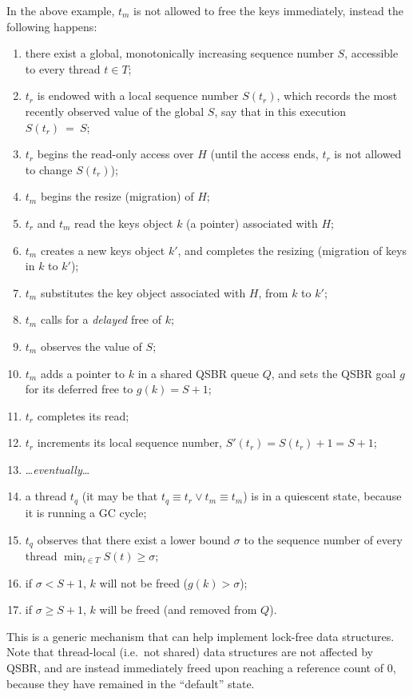 In the above example, $t_m$ is not allowed to free the keys immediately, instead the following happens:
\begin{enumerate}
    \item there exist a global, monotonically increasing sequence number $S$, accessible to every thread $t \in T$;
    \item $t_r$ is endowed with a local sequence number $S(t_r)$, which records the most recently observed value of the global $S$, say that in this execution $S(t_r)~=~S$;
    \item $t_r$ begins the read-only access over $H$ (until the access ends, $t_r$ is not allowed to change $S(t_r)$);
    \item $t_m$ begins the resize (migration) of $H$;
    \item $t_r$ and $t_m$ read the keys object $k$ (a pointer) associated with $H$;
    \item $t_m$ creates a new keys object $k'$, and completes the resizing (migration of keys in $k$ to $k'$);
    \item $t_m$ substitutes the key object associated with $H$, from $k$ to $k'$;
    \item $t_m$ calls for a \emph{delayed} free of $k$;
    \item $t_m$ observes the value of $S$;
    \item $t_m$ adds a pointer to $k$ in a shared QSBR queue $Q$, and sets the QSBR goal $g$ for its deferred free to $g(k) = S + 1$;
    \item $t_r$ completes its read;
    \item $t_r$ increments its local sequence number, $S'(t_r) = S(t_r) + 1 = S + 1$;
    \item \ldots\emph{eventually}\ldots
    \item a thread $t_q$ (it may be that $t_q \equiv t_r \vee t_m \equiv t_m$) is in a quiescent state, because it is running a GC cycle;
    \item $t_q$ observes that there exist a lower bound $\sigma$ to the sequence number of every thread $\min_{t \in T} S(t) \geq \sigma$;
    \item if $\sigma < S + 1$, $k$ will not be freed ($g(k) > \sigma$);
    \item if $\sigma \geq S + 1$, $k$ will be freed (and removed from $Q$).
\end{enumerate}

This is a generic mechanism that can help implement lock-free data structures.
Note that thread-local (i.e.\ not shared) data structures are not affected by QSBR, and are instead immediately freed upon reaching a reference count of 0, because they have remained in the ``default'' state.



